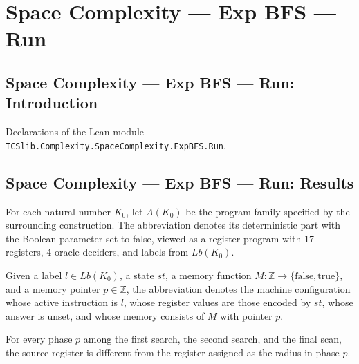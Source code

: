 \section{Space Complexity --- Exp BFS --- Run}
\subsection*{Space Complexity --- Exp BFS --- Run: Introduction}

Declarations of the Lean module \texttt{TCSlib.Complexity.SpaceComplexity.ExpBFS.Run}.

\subsection*{Space Complexity --- Exp BFS --- Run: Results}

\begin{definition}
\label{Complexity.LogProg.ExpBFS.Ad}
\leanok
{}
For each natural number $K_0$, let $A(K_0)$ be the program family specified by the
surrounding construction. The abbreviation denotes its deterministic part with the
Boolean parameter set to false, viewed as a register program with 17 registers, 4 oracle
deciders, and labels from $Lb(K_0)$.
\end{definition}

\begin{definition}
\label{Complexity.LogProg.ExpBFS.cf}
\leanok
{}
Given a label $l\in Lb(K_0)$, a state $st$, a memory function $M:\mathbb
Z\to\{\mathrm{false},\mathrm{true}\}$, and a memory pointer $p\in\mathbb Z$, the
abbreviation denotes the machine configuration whose active instruction is $l$, whose
register values are those encoded by $st$, whose answer is unset, and whose memory
consists of $M$ with pointer $p$.
\end{definition}

\begin{lemma}
\label{Complexity.LogProg.ExpBFS.rad_ne_U}
\leanok
{}
For every phase $p$ among the first search, the second search, and the final scan, the
source register is different from the register assigned as the radius in phase $p$.
\end{lemma}

